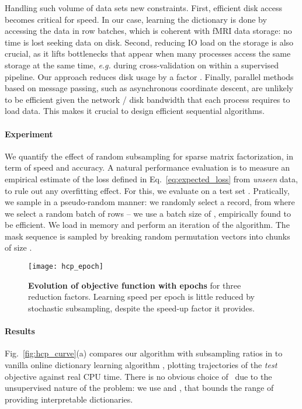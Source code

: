 \documentclass{article}
\begin{document}
Handling such volume of data sets new constraints. First,
efficient disk access becomes critical for speed. In our case,
learning the dictionary is done by accessing the data in row batches, which is
coherent with fMRI data storage: no time is lost seeking data on
disk. Second, reducing IO load on the storage is also
crucial, as it lifts bottlenecks that appear when many processes
access the same storage at the same time, \emph{e.g.} during
cross-validation on  within a supervised pipeline. Our approach
reduces disk usage by a factor . Finally,
parallel methods based on message passing, such as
asynchronous coordinate descent, are unlikely to be efficient given the network /
disk bandwidth that each process requires to load data. This makes it crucial to design
efficient sequential algorithms.


\paragraph{Experiment}We quantify the effect of random subsampling for sparse
matrix factorization, in term of speed and accuracy.
A natural performance evaluation is to measure an
empirical estimate of the loss  defined in Eq.~\ref{eq:expected_loss} from \textit{unseen} data, to
rule out any overfitting effect. For this, we evaluate  on a test set .
Pratically, we sample  in a pseudo-random manner: we randomly select a
record, from where we select a random batch of rows  -- we use a batch
size of , empirically found to be efficient. We load  in memory
and perform an iteration of the algorithm. The mask sequence is sampled by breaking random permutation vectors into chunks of size .

\begin{figure}
\texttt{[image: hcp\_epoch]}
\vspace{-1.5em}
\caption{\textbf{Evolution of objective function with epochs} for three reduction factors. Learning speed per epoch is little reduced
 by stochastic subsampling, despite the speed-up factor it provides.
\label{fig:epoch}}
\end{figure}

\paragraph{Results}Fig.~\ref{fig:hcp_curve}(a) compares our algorithm with
subsampling ratios  in  to vanilla online dictionary learning
algorithm , plotting trajectories of the \emph{test} objective against real CPU
time. There is no obvious choice of~ due to the unsupervised nature of
the problem: we use  and , that bounds the range of  providing
interpretable dictionaries.
\end{document}
